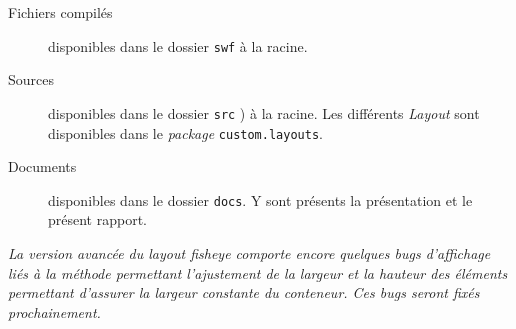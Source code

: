 \begin{description}
  \item[Fichiers compilés] disponibles dans le dossier \texttt{swf} à la racine.
  \item[Sources] disponibles dans le dossier \texttt{src} ) à la racine. Les différents \emph{Layout} sont disponibles dans le \emph{package} \texttt{custom.layouts}.
  \item[Documents] disponibles dans le dossier \texttt{docs}. Y sont présents la présentation et le présent rapport.
\end{description}

\textit{La version avancée du layout \emph{fisheye} comporte encore quelques bugs d'affichage liés à la méthode permettant l'ajustement de la largeur et la hauteur des éléments permettant d'assurer la largeur constante du conteneur. Ces bugs seront fixés prochainement.}